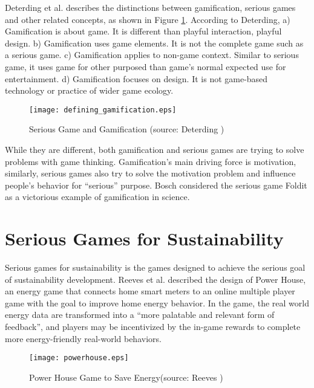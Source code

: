 Deterding et al. \cite{Deterding2011mt} describes the distinctions between gamification, serious games and other related concepts, as shown in Figure \ref{fig:define_gamification}. According to Deterding, a) Gamification is about game. It is different than playful interaction, playful design. b) Gamification uses game elements. It is not the complete game such as a serious game. c) Gamification applies to non-game context. Similar to serious game, it uses game for other purposed than game's normal expected use for entertainment. d) Gamification focuses on design. It is not game-based technology or practice of wider game ecology.

\begin{figure}[htbp]
	\centering
		\texttt{[image: defining\_gamification.eps]}
		\caption{Serious Game and Gamification (source: Deterding \cite{Deterding2011mt})}
		\label{fig:define_gamification}
\end{figure}

While they are different, both gamification and serious games are trying to solve problems with game thinking. Gamification's main driving force is motivation, similarly, serious games also try to solve the motivation problem and influence people's behavior for ``serious'' purpose.  Bosch \cite{bosch2011} considered the serious game Foldit as a victorious example of gamification in science.

\section{Serious Games for Sustainability}

Serious games for sustainability is the games designed to achieve the serious goal of sustainability development.  Reeves et al. \cite{Reeves2011powerhouse} described the design of Power House, an energy game that connects home smart meters to an online multiple player game with the goal to improve home energy behavior. In the game, the real world energy data are transformed into a ``more palatable and relevant form of
feedback'', and players may be incentivized by the in-game rewards to complete more energy-friendly real-world behaviors.

\begin{figure}[htbp]
	\centering
		\texttt{[image: powerhouse.eps]}
		\caption{Power House Game to Save Energy(source: Reeves \cite{Reeves2011powerhouse})}
		\label{fig:powerhouse}
\end{figure}

